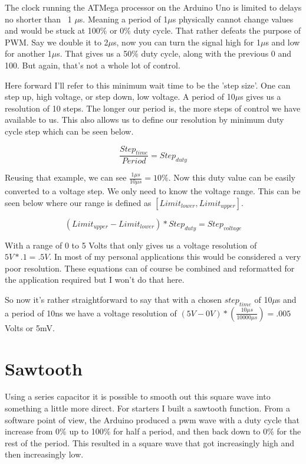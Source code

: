 \documentclass[prb,preprint]{revtex4-1}
\begin{document}
The clock running the ATMega processor on the Arduino Uno is limited to delays no shorter than ~1 $\mu$s. Meaning a period of 1$\mu$s physically cannot change values and would be stuck at 100\% or 0\% duty cycle. That rather defeats the purpose of PWM. Say we double it to 2$\mu$s, now you can turn the signal high for 1$\mu$s and low for another 1$\mu$s. That gives us a 50\% duty cycle, along with the previous 0 and 100. But again, that's not a whole lot of control.

Here forward I'll refer to this minimum wait time to be the 'step size'. One can step up, high voltage, or step down, low voltage. A period of 10$\mu$s gives us a resolution of 10 steps. The longer our period is, the more steps of control we have available to us. This also allows us to define our resolution by minimum duty cycle step which can be seen below.

\begin{equation}
\frac{Step_{time}}{Period} = Step_{duty}
\end{equation}

Reusing that example, we can see $\frac{1\mu s}{10\mu s} = 10\%$. Now this duty value can be easily converted to a voltage step. We only need to know the voltage range. This can be seen below where our range is defined as $[Limit_{lower}, Limit_{upper}]$.

\begin{equation}
(Limit_{upper} - Limit_{lower}) * Step_{duty} = Step_{voltage}
\end{equation}

With a range of 0 to 5 Volts that only gives us a voltage resolution of $5V * .1 = .5V$. In most of my personal applications this would be considered a very poor resolution. These equations can of course be combined and reformatted for the application required but I won't do that here.

So now it's rather straightforward to say that with a chosen $step_{time}$ of 10$\mu$s and a period of 10ns we have a voltage resolution of $(5V - 0V) * (\frac{10\mu s}{10000\mu s}) = .005$ Volts or 5mV.

\section{Sawtooth}
Using a series capacitor it is possible to smooth out this square wave into something a little more direct. For starters I built a sawtooth function. From a software point of view, the Arduino produced a pwm wave with a duty cycle that increase from 0\% up to 100\% for half a period, and then back down to 0\% for the rest of the period. This resulted in a square wave that got increasingly high and then increasingly low. 
\end{document}
